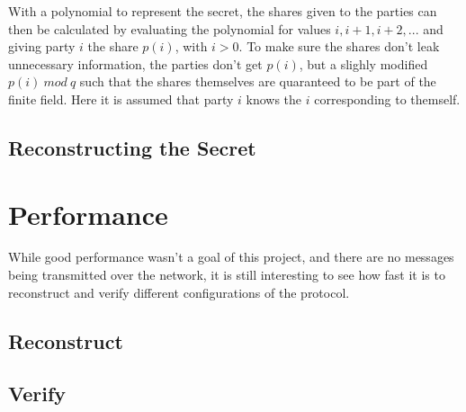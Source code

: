 \documentclass[a4paper,oneside,12pt,final]{article}
\begin{document}
With a polynomial to represent the secret, the shares given to the parties can
then be calculated by evaluating the polynomial for values $i, i+1, i+2, ...$
and giving party $i$ the share $p(i)$, with $i > 0$. To make sure the shares
don't leak unnecessary information, the parties don't get $p(i)$, but a slighly
modified $p(i)\ mod\ q$ such that the shares themselves are quaranteed to be
part of the finite field. Here it is assumed that party $i$ knows the $i$
corresponding to themself.

\subsection{Reconstructing the Secret}

\section{Performance}

While good performance wasn't a goal of this project, and there are no messages
being transmitted over the network, it is still interesting to see how fast it
is to reconstruct and verify different configurations of the protocol.

\subsection{Reconstruct}
\subsection{Verify}
\end{document}
